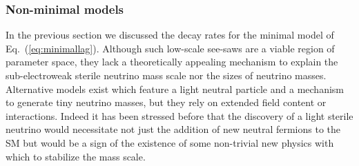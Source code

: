 \documentclass[11pt, a4paper]{article}
\newcommand{\refeq}[1]{Eq.~(\ref{#1})}
\def\ster{\ensuremath N}
\begin{document}
\subsubsection{\label{sec:nonminimal}Non-minimal models}


In the previous section we discussed the decay rates for the minimal model of
\refeq{eq:minimallag}. Although such low-scale see-saws are a viable region of
parameter space, they lack a theoretically appealing mechanism to explain the
sub-electroweak sterile neutrino mass scale nor the sizes of neutrino masses.
Alternative models exist which feature a light neutral particle and a mechanism
to generate tiny neutrino masses, but they rely on extended field content or
interactions.
%
Indeed it has been stressed before \cite{delAguila:2008ir} that the discovery
of a light sterile neutrino would necessitate not just the addition of new
neutral fermions to the SM but would be a sign of the existence of some
non-trivial new physics with which to stabilize the mass scale.
 
\end{document}

